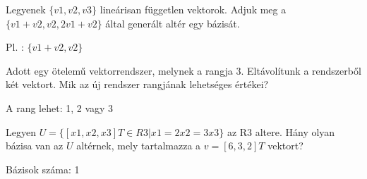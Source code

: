 \begin{frame}
  \begin{tcolorbox}[title={3/9. -N-}]
     Legyenek $\{v1,v2,v3\}$ lineárisan független vektorok. Adjuk meg a $\{v1 + v2,v2,2v1 + v2\}$ által generált altér egy bázisát.

  \tcblower

    \mmedskip 
  
     Pl. : $\{v1 + v2,v2\}$
  \end{tcolorbox}
\end{frame}


\begin{frame}
  \begin{tcolorbox}[title={3/10. -Q-}]
     Adott egy ötelemű vektorrendszer, melynek a rangja $3.$ Eltávolítunk a rendszerből két vektort. Mik az új rendszer rangjának lehetséges értékei?
  \tcblower

    \mmedskip 
  
     A rang lehet: 1, 2 vagy 3

  \end{tcolorbox}
\end{frame}


\begin{frame}
  \begin{tcolorbox}[title={3/11. -Q-}]
     Legyen $U = \{[x1,x2,x3]T ∈ R3|x1 = 2x2 = 3x3\}$ az R3 altere. Hány olyan bázisa van az $U$ altérnek, mely tartalmazza a $v = [6,3,2]T$ vektort?
  \tcblower

    \mmedskip 
    Bázisok száma: 1
  \end{tcolorbox}
\end{frame}



